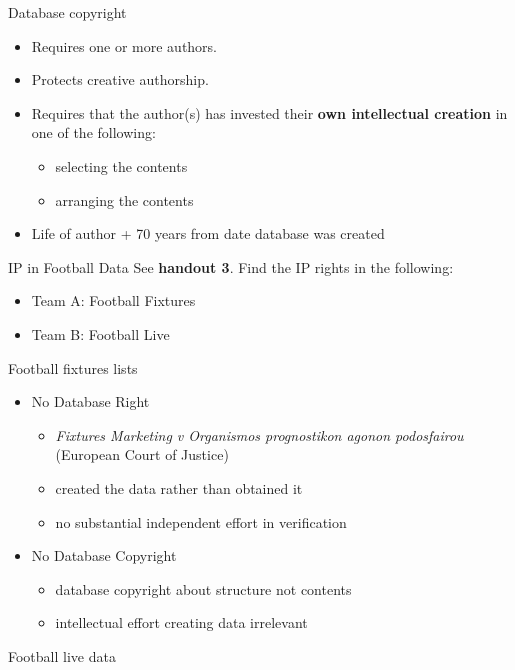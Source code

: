 \documentclass[aspectratio=169]{beamer}
\begin{document}
\begin{frame}{Database copyright}
  \begin{itemize}
  \item Requires one or more authors.
  \item Protects creative authorship.
  \item Requires that the author(s) has invested their {\bf own intellectual creation} in one of the following:
    \begin{itemize}
    \item selecting the contents
    \item arranging the contents
    \end{itemize}
  \item Life of  author + 70 years from date database was created
  \end{itemize}
\end{frame}

%

  \begin{frame}{IP in Football Data}
    See {\bf handout 3}. Find the IP rights in the following:
    \begin{itemize}
    \item Team A: Football Fixtures
    \item Team B: Football Live
    \end{itemize}
  \end{frame}


  \begin{frame}{Football fixtures lists}
      \begin{itemize}
      \item No Database Right
        \begin{itemize}
        \item {\protect\textit{Fixtures Marketing v Organismos prognostikon agonon podosfairou }} (European Court of Justice)
        \item created the data rather than obtained it
        \item no substantial independent effort in verification
        \end{itemize}
      \item No Database Copyright
        \begin{itemize}
        \item database copyright about structure not contents
        \item intellectual effort creating data irrelevant
        \end{itemize}
      \end{itemize}
  \end{frame}

  \begin{frame}{Football live data}
    
  \end{frame}
\end{document}

